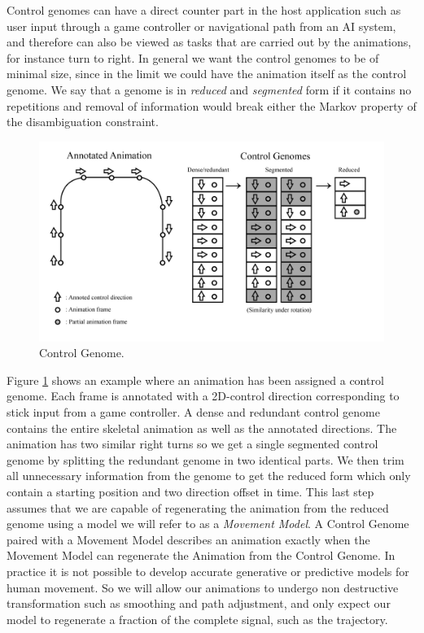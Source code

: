 Control genomes can have a direct counter part in the host application such as user input through a game controller or navigational path from an AI system, and therefore can also be viewed as tasks that are carried out by the animations, for instance turn to right. In general we want the control genomes to be of minimal size, since in the limit we could have the animation itself as the control genome. We say that a genome is in \textit{reduced} and \textit{segmented} form if it contains no repetitions and removal of information would break either the Markov property of the disambiguation constraint. 

\begin{figure}
    \centering
    \includegraphics[width=1\columnwidth]{img/controlgenome.png}
    \caption{Control Genome.}
    \label{fig:control:genome}
\end{figure}

Figure \ref{fig:control:genome} shows an example where an animation has been assigned a control genome. Each frame is annotated with a 2D-control direction corresponding to stick input from a game controller. A dense and redundant control genome contains the entire skeletal animation as well as the annotated directions. The animation has two similar right turns so we get a single segmented control genome by splitting the redundant genome in two identical parts. We then trim all unnecessary information from the genome to get the reduced form which only contain a starting position and two direction offset in time. This last step assumes that we are capable of regenerating the animation from the reduced genome using a model we will refer to as a \textit{Movement Model}. A Control Genome paired with a Movement Model describes an animation exactly when the Movement Model can regenerate the Animation from the Control Genome.  In practice it is not possible to develop accurate generative or predictive models for human movement. So we will allow our animations to undergo non destructive transformation such as smoothing and path adjustment, and only expect our model to regenerate a fraction of the complete signal, such as the trajectory. 

